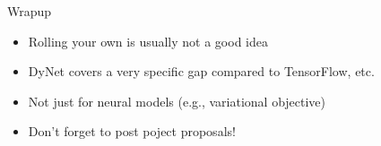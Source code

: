 \documentclass[compress]{beamer}
\begin{document}
\begin{frame}{Wrapup}

  \begin{itemize}
    \item Rolling your own is usually not a good idea
    \item DyNet covers a very specific gap compared to TensorFlow, etc.
    \item Not just for neural models (e.g., variational objective)
      \pause
    \item Don't forget to post poject proposals!
  \end{itemize}

\end{frame}
\end{document}
